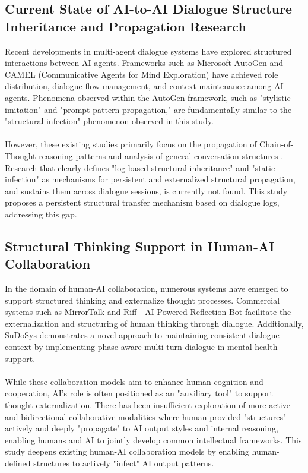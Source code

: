 \documentclass[11pt]{article}
\begin{document}
\subsection{Current State of AI-to-AI Dialogue Structure Inheritance and Propagation Research}
Recent developments in multi-agent dialogue systems have explored structured interactions between AI agents. Frameworks such as Microsoft AutoGen \cite{ref2} and CAMEL (Communicative Agents for Mind Exploration) \cite{ref6} have achieved role distribution, dialogue flow management, and context maintenance among AI agents. Phenomena observed within the AutoGen framework, such as "stylistic imitation" and "prompt pattern propagation," are fundamentally similar to the "structural infection" phenomenon observed in this study. \\
 \\
However, these existing studies primarily focus on the propagation of Chain-of-Thought reasoning patterns and analysis of general conversation structures \cite{ref3}. Research that clearly defines "log-based structural inheritance" and "static infection" as mechanisms for persistent and externalized structural propagation, and sustains them across dialogue sessions, is currently not found. This study proposes a persistent structural transfer mechanism based on dialogue logs, addressing this gap.
\subsection{Structural Thinking Support in Human-AI Collaboration}
In the domain of human-AI collaboration, numerous systems have emerged to support structured thinking and externalize thought processes. Commercial systems such as MirrorTalk \cite{ref8} and Riff - AI-Powered Reflection Bot \cite{ref11} facilitate the externalization and structuring of human thinking through dialogue. Additionally, SuDoSys \cite{ref13} demonstrates a novel approach to maintaining consistent dialogue context by implementing phase-aware multi-turn dialogue in mental health support. \\
\\
While these collaboration models aim to enhance human cognition and cooperation, AI's role is often positioned as an "auxiliary tool" to support thought externalization. There has been insufficient exploration of more active and bidirectional collaborative modalities where human-provided "structures" actively and deeply "propagate" to AI output styles and internal reasoning, enabling humans and AI to jointly develop common intellectual frameworks. This study deepens existing human-AI collaboration models by enabling human-defined structures to actively "infect" AI output patterns.
\end{document}
